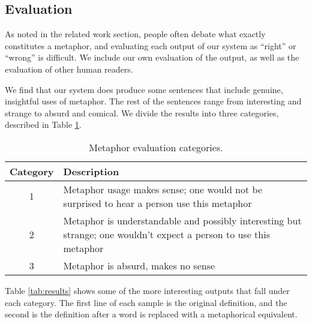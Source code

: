 \documentclass[12pt]{article}
\begin{document}
\subsection{Evaluation}

As noted in the related work section, people often debate what exactly constitutes a metaphor, and evaluating each output of our system as ``right'' or ``wrong'' is difficult. We include our own evaluation of the output, as well as the evaluation of other human readers.

We find that our system does produce some sentences that include genuine, insightful uses of metaphor. The rest of the sentences range from interesting and strange to absurd and comical. We divide the results into three categories, described in Table \ref{tab:evalcats}.

\begin{table}[h]
	\centering
	\small
	\begin{tabular}{|c|p{12cm}|} \hline
		\textbf{Category} & \textbf{Description}\\ \hline
		1 & Metaphor usage makes sense; one would not be surprised to hear a person use this metaphor\\ \hline
        2 & Metaphor is understandable and possibly interesting but strange; one wouldn’t expect a person to use this metaphor\\ \hline
		3 & Metaphor is absurd, makes no sense\\ \hline
	\end{tabular}
	\caption{Metaphor evaluation categories.}
	\label{tab:evalcats}
\end{table}

Table \ref{tab:results} shows some of the more interesting outputs that fall under each category. The first line of each sample is the original definition, and the second is the definition after a word is replaced with a metaphorical equivalent.
\end{document}
